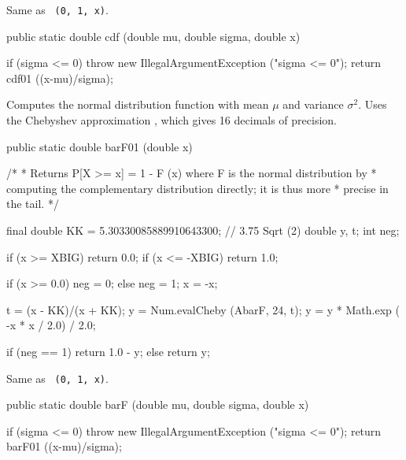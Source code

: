 \begin{tabb} Same as ~\texttt{(0, 1, x)}.
\end{tabb}
\begin{code}

   public static double cdf (double mu, double sigma, double x)\begin{hide} {
      if (sigma <= 0)
         throw new IllegalArgumentException ("sigma <= 0");
      return cdf01 ((x-mu)/sigma);
   }\end{hide}
\end{code}
\begin{tabb} Computes the normal distribution function with mean
   $\mu$ and variance $\sigma^2$.
   Uses the Chebyshev approximation ,
   which gives 16 decimals of precision.
\end{tabb}
\begin{code}

   public static double barF01 (double x)\begin{hide} {
   /*
    * Returns P[X >= x] = 1 - F (x) where F is the normal distribution by
    * computing the complementary distribution directly; it is thus more
    * precise in the tail.
    */

      final double KK = 5.30330085889910643300;      // 3.75 Sqrt (2)
      double y, t;
      int neg;

      if (x >= XBIG)
         return 0.0;
      if (x <= -XBIG)
         return 1.0;

      if (x >= 0.0)
         neg = 0;
      else {
         neg = 1;
         x = -x;
      }

      t = (x - KK)/(x + KK);
      y = Num.evalCheby (AbarF, 24, t);
      y = y * Math.exp ( -x * x / 2.0) / 2.0;

      if (neg == 1)
         return 1.0 - y;
      else
         return y;
   }\end{hide}
\end{code}
 \begin{tabb} Same as
 ~\texttt{(0, 1, x)}.
 \end{tabb}
\begin{code}

   public static double barF (double mu, double sigma, double x)\begin{hide} {
      if (sigma <= 0)
         throw new IllegalArgumentException ("sigma <= 0");
      return barF01 ((x-mu)/sigma);
   }\end{hide}
\end{code}

